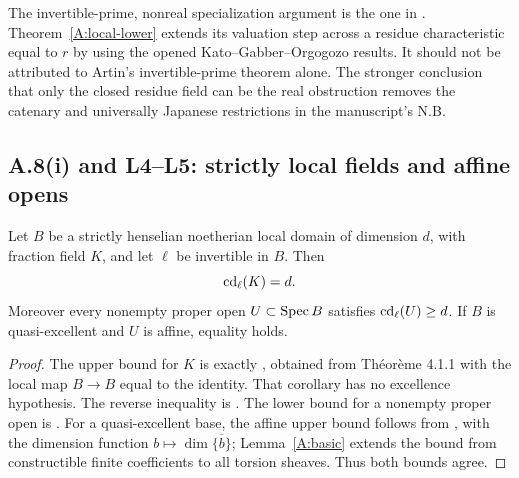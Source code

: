 \begin{remark}
The invertible-prime, nonreal specialization argument is the one in \citet[Exposé X, Corollaires 2.4 and 2.5]{A_SGA4}. Theorem~\ref{A:local-lower} extends its valuation step across a residue characteristic equal to $r$ by using the opened Kato--Gabber--Orgogozo results. It should not be attributed to Artin's invertible-prime theorem alone. The stronger conclusion that only the closed residue field can be the real obstruction removes the catenary and universally Japanese restrictions in the manuscript's N.B.
\end{remark}

\subsection{A.8(i) and L4--L5: strictly local fields and affine opens}

\begin{theorem}
\label{A:strict-field}
Let $B$ be a strictly henselian noetherian local domain of dimension $d$, with fraction field $K$, and let $\ell$ be invertible in $B$. Then
\[
\operatorname{cd}_\ell(K)=d.
\]
Moreover every nonempty proper open $U\subset\operatorname{Spec} B$ satisfies $\operatorname{cd}_\ell(U)\geq d$. If $B$ is quasi-excellent and $U$ is affine, equality holds.
\end{theorem}
\begin{proof}
The upper bound for $K$ is exactly \citet[Exposé XVIII$_B$, Corollaire 4.1.3]{A_ILO2014}, obtained from Théorème 4.1.1 with the local map $B\to B$ equal to the identity. That corollary has no excellence hypothesis. The reverse inequality is \citet[Exposé X, Corollaire 2.5]{A_SGA4}. The lower bound for a nonempty proper open is \citet[Exposé XVIII$_B$, Théorème 6.1]{A_ILO2014}. For a quasi-excellent base, the affine upper bound follows from \citet[Exposé XV, Corollaires 1.2.2 and 1.2.4]{A_ILO2014}, with the dimension function $b\mapsto\dim\overline{\{b\}}$; Lemma~\ref{A:basic} extends the bound from constructible finite coefficients to all torsion sheaves. Thus both bounds agree.
\end{proof}

